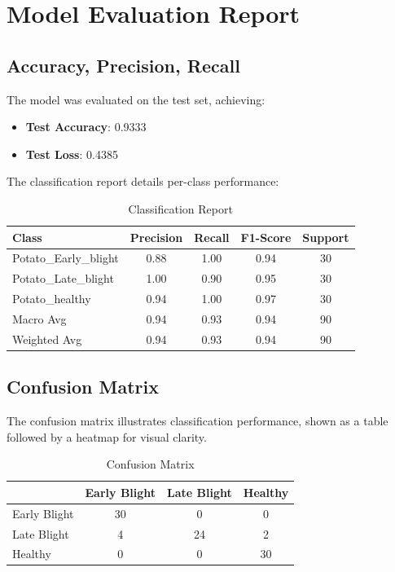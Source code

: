 \documentclass{article}
\begin{document}
\section{Model Evaluation Report}
\subsection{Accuracy, Precision, Recall}
The model was evaluated on the test set, achieving:
\begin{itemize}
    \item \textbf{Test Accuracy}: 0.9333
    \item \textbf{Test Loss}: 0.4385
\end{itemize}
The classification report details per-class performance:
\begin{table}[htbp]
    \centering
    \begin{tabular}{lcccc}
        \toprule
        Class & Precision & Recall & F1-Score & Support \\
        \midrule
        Potato\_Early\_blight & 0.88 & 1.00 & 0.94 & 30 \\
        Potato\_Late\_blight & 1.00 & 0.90 & 0.95 & 30 \\
        Potato\_healthy & 0.94 & 1.00 & 0.97 & 30 \\
        \midrule
        Macro Avg & 0.94 & 0.93 & 0.94 & 90 \\
        Weighted Avg & 0.94 & 0.93 & 0.94 & 90 \\
        \bottomrule
    \end{tabular}
    \caption{Classification Report}
    \label{tab:class_report}
\end{table}

\subsection{Confusion Matrix}
The confusion matrix illustrates classification performance, shown as a table followed by a heatmap for visual clarity.

\begin{table}[b]
    \centering
    \begin{tabular}{lccc}
        \toprule
        & Early Blight & Late Blight & Healthy \\
        \midrule
        Early Blight & 30 & 0 & 0 \\
        Late Blight & 4 & 24 & 2 \\
        Healthy & 0 & 0 & 30 \\
        \bottomrule
    \end{tabular}
    \caption{Confusion Matrix}
    \label{tab:conf_matrix}
\end{table}
\end{document}
